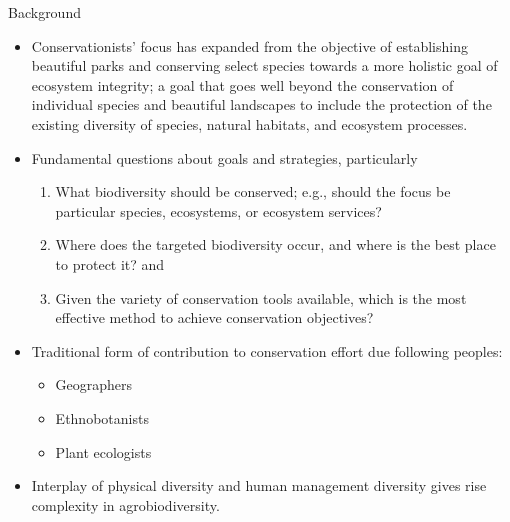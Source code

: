 \documentclass[
  ignorenonframetext,
  aspectratio=169]{beamer}
\providecommand{\tightlist}{%
  \setlength{\itemsep}{0pt}\setlength{\parskip}{0pt}}
\begin{document}
\begin{frame}{Background}
\protect\hypertarget{background}{}
\begin{itemize}
\tightlist
\item
  Conservationists' focus has expanded from the objective of
  establishing beautiful parks and conserving select species towards a
  more holistic goal of ecosystem integrity; a goal that goes well
  beyond the conservation of individual species and beautiful landscapes
  to include the protection of the existing diversity of species,
  natural habitats, and ecosystem processes.
\item
  Fundamental questions about goals and strategies, particularly

  \begin{enumerate}
  \tightlist
  \item
    What biodiversity should be conserved; e.g., should the focus be
    particular species, ecosystems, or ecosystem services?
  \item
    Where does the targeted biodiversity occur, and where is the best
    place to protect it? and
  \item
    Given the variety of conservation tools available, which is the most
    effective method to achieve conservation objectives?
  \end{enumerate}
\end{itemize}
\end{frame}

\begin{frame}{}
\protect\hypertarget{section-1}{}
\begin{itemize}
\tightlist
\item
  Traditional form of contribution to conservation effort due following
  peoples:

  \begin{itemize}
  \tightlist
  \item
    Geographers
  \item
    Ethnobotanists
  \item
    Plant ecologists
  \end{itemize}
\item
  Interplay of physical diversity and human management diversity gives
  rise complexity in agrobiodiversity.
\end{itemize}
\end{frame}
\end{document}
